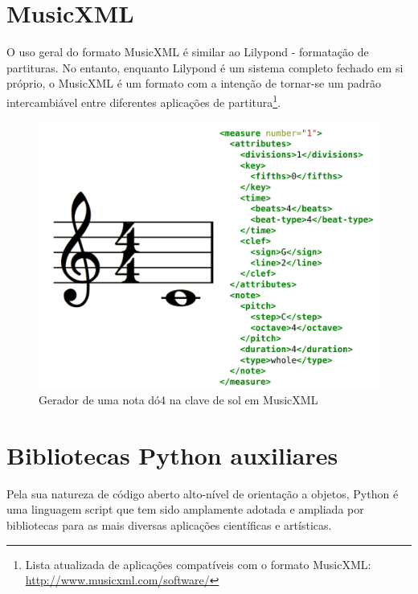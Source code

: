 \documentclass[
	12pt,				%
	openright,			%
	twoside,			%
	a4paper,			%
	english,			%
	french,				%
	spanish,			%
	brazil				%
	]{abntex2}
\begin{document}
\section{MusicXML}

O uso geral do formato MusicXML é similar ao Lilypond - formatação de partituras. No entanto, enquanto Lilypond é um sistema completo fechado em si próprio, o MusicXML é um formato com a intenção de tornar-se um padrão intercambiável entre diferentes aplicações de partitura\footnote{ Lista atualizada de aplicações compatíveis com o formato MusicXML: \url{http://www.musicxml.com/software/} }.


\begin{figure}[htb]
	\caption{\label{fig_grafico}Gerador de uma nota dó4 na clave de sol em MusicXML}
	\begin{center}
	    \includegraphics[scale=0.5]{score/musicxml.pdf}
	\end{center}
\end{figure}

\pagebreak
\section{Bibliotecas Python auxiliares}

Pela sua natureza de código aberto alto-nível de orientação a objetos, Python\cite{van1995python} é uma linguagem script que tem sido amplamente adotada e ampliada por bibliotecas para as mais diversas aplicações científicas e artísticas.\cite{downey2009python,Kroger201208}
\end{document}
